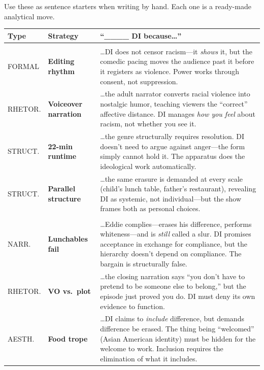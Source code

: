 \documentclass[12pt]{article}
\begin{document}
{\small Use these as sentence starters when writing by hand. Each one is a ready-made analytical move.}

\vspace{6pt}
\renewcommand{\arraystretch}{1.5}
\begin{tabularx}{\textwidth}{|>{\centering\arraybackslash}p{1.3cm}|>{\raggedright\arraybackslash\bfseries}p{1.8cm}|X|}
\hline
\textbf{Type} & \textbf{Strategy} & \textbf{``\_\_\_\_ DI because\ldots''} \\
\hline
\multicolumn{3}{|l|}{\textbf{COMPLICATES DI because\ldots}} \\
\hline
{\scriptsize FORMAL} & Editing rhythm &
\ldots DI does not censor racism---it \textit{shows} it, but the comedic pacing moves the audience past it before it registers as violence. Power works through consent, not suppression. \\
\hline
{\scriptsize RHETOR.} & Voiceover narration &
\ldots the adult narrator converts racial violence into nostalgic humor, teaching viewers the ``correct'' affective distance. DI manages \textit{how you feel} about racism, not whether you see it. \\
\hline
{\scriptsize STRUCT.} & 22-min runtime &
\ldots the genre structurally requires resolution. DI doesn't need to argue against anger---the form simply cannot hold it. The apparatus does the ideological work automatically. \\
\hline
{\scriptsize STRUCT.} & Parallel structure &
\ldots the same erasure is demanded at every scale (child's lunch table, father's restaurant), revealing DI as systemic, not individual---but the show frames both as personal choices. \\
\hline
\multicolumn{3}{|l|}{\textbf{CONTRADICTS DI because\ldots}} \\
\hline
{\scriptsize NARR.} & Lunchables fail &
\ldots Eddie complies---erases his difference, performs whiteness---and is \textit{still} called a slur. DI promises acceptance in exchange for compliance, but the hierarchy doesn't depend on compliance. The bargain is structurally false. \\
\hline
{\scriptsize RHETOR.} & VO vs.\ plot &
\ldots the closing narration says ``you don't have to pretend to be someone else to belong,'' but the episode just proved you do. DI must deny its own evidence to function. \\
\hline
{\scriptsize AESTH.} & Food trope &
\ldots DI claims to \textit{include} difference, but demands difference be erased. The thing being ``welcomed'' (Asian American identity) must be hidden for the welcome to work. Inclusion requires the elimination of what it includes. \\

\end{tabularx}
\end{document}
